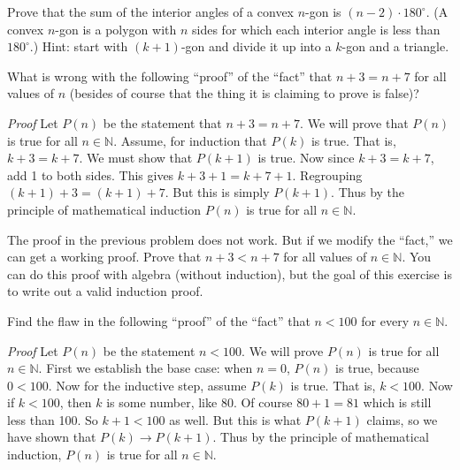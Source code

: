 \documentclass[11pt,]{book}
\makeatletter
\theoremstyle{ptxplainnotitle}
\theoremstyle{ptxplaintitle}
\renewcommand*{\proofname}{Proof}
\renewenvironment{proof}[1][\proofname]{\par
  \pushQED{\qed}%
  \normalfont \topsep6\p@\@plus6\p@\relax
  \trivlist
  \item\relax
    {\itshape
    #1\@addpunct{.}}\hspace\labelsep\ignorespaces
}{%
  \popQED\endtrivlist\@endpefalse
}
\theoremstyle{ptxdefinitionnotitle}
\theoremstyle{ptxdefinitiontitle}
\theoremstyle{ptxdefinitionnotitle}
\theoremstyle{ptxdefinitiontitle}
\theoremstyle{ptxdefinitionnotitle}
\theoremstyle{ptxdefinitiontitle}
\theoremstyle{ptxdefinitiontitlenonumber}
\theoremstyle{ptxdefinitiontitlenonumber}
\numberwithin{equation}{chapter}
\newcommand{\N}{\mathbb N}
\newcommand{\imp}{\rightarrow}
\newcommand{\lt}{<}
\makeatother
\begin{document}
\begin{divisionexercise}{11}\hypertarget{exercise-64}{}
\hypertarget{p-651}{}%
Prove that the sum of the interior angles of a convex \(n\)-gon is \((n-2)\cdot 180^\circ\).  (A convex \(n\)-gon is a polygon with \(n\) sides for which each interior angle is less than \(180^\circ\).)  Hint: start with \((k+1)\)-gon and divide it up into a \(k\)-gon and a triangle.%
\end{divisionexercise}%
\begin{divisionexercise}{12}\hypertarget{exercise-65}{}
\hypertarget{p-657}{}%
What is wrong with the following ``proof'' of the ``fact'' that \(n+3 = n+7\) for all values of \(n\) (besides of course that the thing it is claiming to prove is false)?%
\begin{proof}\hypertarget{proof-14}{}
\hypertarget{p-658}{}%
Let \(P(n)\) be the statement that \(n + 3 = n + 7\). We will prove that \(P(n)\) is true for all \(n \in \N\). Assume, for induction that \(P(k)\) is true. That is, \(k+3 = k+7\). We must show that \(P(k+1)\) is true. Now since \(k + 3 = k + 7\), add 1 to both sides. This gives \(k + 3 + 1 = k + 7 + 1\). Regrouping \((k+1) + 3 = (k+1) + 7\). But this is simply \(P(k+1)\). Thus by the principle of mathematical induction \(P(n)\) is true for all \(n \in \N\).%
\end{proof}
\end{divisionexercise}%
\begin{divisionexercise}{13}\hypertarget{exercise-66}{}
\hypertarget{p-660}{}%
The proof in the previous problem does not work. But if we modify the ``fact,'' we can get a working proof. Prove that \(n + 3 \lt  n + 7\) for all values of \(n \in \N\). You can do this proof with algebra (without induction), but the goal of this exercise is to write out a valid induction proof.%
\end{divisionexercise}%
\begin{divisionexercise}{14}\hypertarget{exercise-67}{}
\hypertarget{p-662}{}%
Find the flaw in the following ``proof'' of the ``fact'' that \(n \lt  100\) for every \(n \in \N\).%
\begin{proof}\hypertarget{proof-16}{}
\hypertarget{p-663}{}%
Let \(P(n)\) be the statement \(n \lt  100\). We will prove \(P(n)\) is true for all \(n \in \N\). First we establish the base case: when \(n = 0\), \(P(n)\) is true, because \(0 \lt  100\). Now for the inductive step, assume \(P(k)\) is true. That is, \(k \lt  100\). Now if \(k \lt  100\), then \(k\) is some number, like 80. Of course \(80+1 = 81\) which is still less than 100. So \(k +1 \lt  100\) as well. But this is what \(P(k+1)\) claims, so we have shown that \(P(k) \imp P(k+1)\). Thus by the principle of mathematical induction, \(P(n)\) is true for all \(n \in \N\).%
\end{proof}
\end{divisionexercise}%
\end{document}
